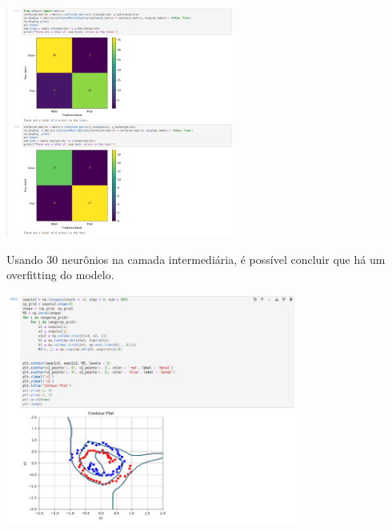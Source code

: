 \documentclass{article}
\begin{document}
\begin{center}

\includegraphics[height=3in]{exercise_pic/spirals/conf_matrix_spirals_10.png}
\vspace{10pt}
    
\end{center}
Usando 30 neurônios na camada intermediária, é possível concluir que há um overfitting do modelo.

\begin{center}

\includegraphics[height=3in]{exercise_pic/spirals/plot_graph_sep_spirals_30.png}
\vspace{10pt}

\end{center}
\end{document}

